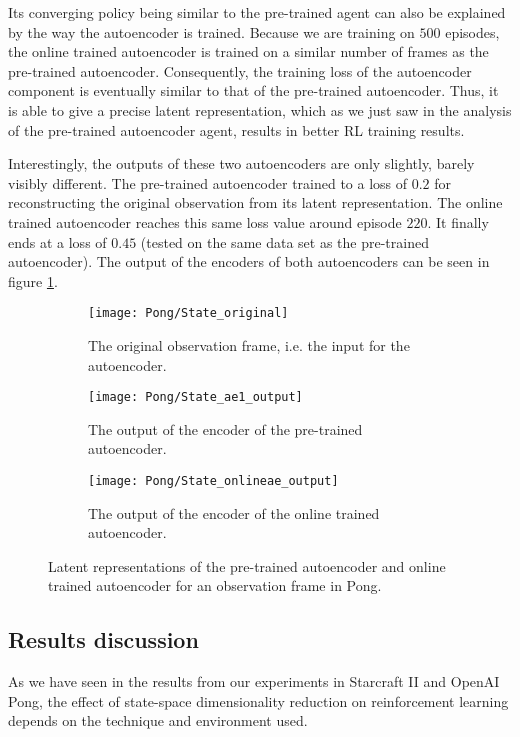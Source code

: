 Its converging policy being similar to the pre-trained agent can also be explained by the way the autoencoder is trained. Because we are training on $500$ episodes, the online trained autoencoder is trained on a similar number of frames as the pre-trained autoencoder. Consequently, the training loss of the autoencoder component is eventually similar to that of the pre-trained autoencoder. Thus, it is able to give a precise latent representation, which as we just saw in the analysis of the pre-trained autoencoder agent, results in better RL training results.

Interestingly, the outputs of these two autoencoders are only slightly, barely visibly different. The pre-trained autoencoder trained to a loss of $0.2$ for reconstructing the original observation from its latent representation. The online trained autoencoder reaches this same loss value around episode $220$. It finally ends at a loss of $0.45$ (tested on the same data set as the pre-trained autoencoder). The output of the encoders of both autoencoders can be seen in figure \ref{fig:online-ae-output-pong}.

\begin{figure}[h]
	\centering
	\begin{subfigure}[b]{0.45\textwidth}
		\texttt{[image: Pong/State\_original]}
		\caption{The original observation frame, i.e. the input for the autoencoder.}
	\end{subfigure}\hfill
	\begin{subfigure}[b]{0.45\textwidth}
		\texttt{[image: Pong/State\_ae1\_output]}
		\caption{The output of the encoder of the pre-trained autoencoder.}
	\end{subfigure}\medskip
	\begin{subfigure}[b]{0.45\textwidth}
		\texttt{[image: Pong/State\_onlineae\_output]}
		\caption{The output of the encoder of the online trained autoencoder.}
	\end{subfigure}
	\caption{Latent representations of the pre-trained autoencoder and online trained autoencoder for an observation frame in Pong.}
	\label{fig:online-ae-output-pong}
\end{figure}

\clearpage
\subsection{Results discussion}\label{research-discussion}
As we have seen in the results from our experiments in Starcraft II and OpenAI Pong, the effect of state-space dimensionality reduction on reinforcement learning depends on the technique and environment used. 

